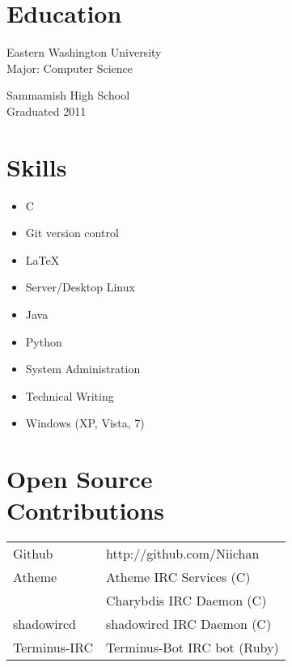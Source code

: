 \documentclass{article}
\begin{document}
\address{12924 SE 26th ST \\ Bellevue WA, 98005 \\ +1 (425) 221-7761}
     
\begin{resume}
\section{Education}
Eastern Washington University \\
Major: Computer Science

Sammamish High School \\
Graduated 2011
     
\section{Skills}
\begin{multicols}{3}
\begin{itemize}
\item C
\item Git version control
\item \LaTeX
\item Server/Desktop Linux
\item Java
\item Python
\item System Administration
\item Technical Writing
\item Windows (XP, Vista, 7)
\end{itemize}
\end{multicols}

\section{Open Source \\ Contributions}
\begin{tabular}{l l}
Github & http://github.com/Niichan \\ [5pt]
Atheme & Atheme IRC Services (C) \\ 
& Charybdis IRC Daemon (C) \\ [5pt]
shadowircd & shadowircd IRC Daemon (C) \\ [5pt]
Terminus-IRC & Terminus-Bot IRC bot (Ruby) \\ [5pt]
\end{tabular}


\end{resume}
\end{document}
